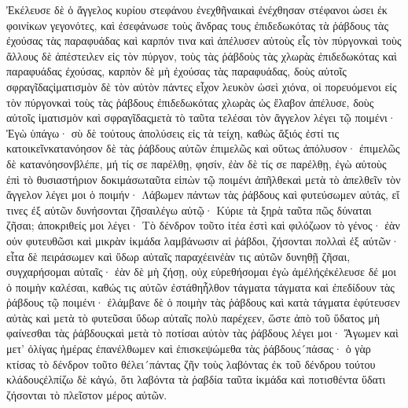 Ἐκέλευσε δὲ ὁ ἄγγελος κυρίου στεφάνου ἐνεχθῆναικαὶ ἐνέχθησαν στέφανοι ὡσει ἐκ φοινίκων γεγονότες, καὶ ἐσεφάνωσε τοὺς ἄνδρας τους ἐπιδεδωκότας τὰ ῥάβδους τὰς ἐχούσας τὰς παραφυάδας καὶ καρπόν τινα καὶ ἀπέλυσεν αὐτοὺς εἶς τὸν πύργονκαὶ τοὺς ἄλλους δὲ ἀπέστειλεν εἰς τὸν πύργον, τοὺς τὰς ῥάβδοὺς τὰς χλωρὰς ἐπιδεδωκότας καὶ παραφυάδας ἐχούσας, καρπὸν δὲ μὴ ἐχούσας τὰς παραφυάδας, δοὺς αὐτοῖς σφραγῖδαςἱματισμὸν δὲ τὸν αὐτὸν πάντες εἶχον λευκὸν ὡσεὶ χιόνα, οἱ πορευόμενοι εἰς τὸν πύργονκαὶ τοὺς τὰς ῥάβδους ἐπιδεδωκότας χλωρὰς ὡς ἔλαβον ἀπέλυσε, δοὺς αὐτοῖς ἱματισμὸν καὶ σφραγῖδαςμετὰ τὸ ταῦτα τελέσαι τὸν ἄγγελον λέγει τῷ ποιμένι· Ἐγὼ ὑπάγω· σὺ δὲ τούτους ἀπολύσεις εἰς τὰ τείχη, καθὼς ἄξιός ἐστί τις κατοικεῖνκατανόησον δὲ τὰς ῥάβδους αὐτῶν ἐπιμελῶς καὶ οὕτως ἀπόλυσον· ἐπιμελῶς δὲ κατανόησονβλέπε, μή τίς σε παρέλθῃ, φησίν, ἐὰν δὲ τίς σε παρέλθῃ, ἐγὼ αὐτοὺς ἐπὶ τὸ θυσιαστήριον δοκιμάσωταῦτα εἰπὼν τῷ ποιμένι ἀπῆλθεκαὶ μετὰ τὸ ἀπελθεῖν τὸν ἄγγελον λέγει μοι ὁ ποιμήν· Λάβωμεν πάντων τὰς ῥάβδους καὶ φυτεύσωμεν αὐτάς, εἴ τινες ἐξ αὐτῶν δυνήσονται ζῆσαιλέγω αὐτῷ· Κύριε τὰ ξηρὰ ταῦτα πῶς δύναται ζῆσαι; ἀποκριθείς μοι λέγει· Τὸ δένδρον τοῦτο ἰτέα ἐστὶ καὶ φιλόζωον τὸ γένος· ἐὰν οὐν φυτευθῶσι καὶ μικρὰν ἰκμάδα λαμβάνωσιν αἱ ῥάβδοι, ζήσονται πολλαὶ ἐξ αὐτῶν· εἶτα δὲ πειράσωμεν καὶ ὕδωρ αὐταῖς παραχέεινἐὰν τις αὐτῶν δυνηθῇ ζῆσαι, συγχαρήσομαι αὐταῖς· ἐὰν δὲ μὴ ζήσῃ, οὐχ εὑρεθήσομαι ἐγὼ ἀμέλήςἐκέλευσε δέ μοι ὁ ποιμὴν καλέσαι, καθώς τις αὐτῶν ἐστάθηἦλθον τάγματα τάγματα καὶ ἐπεδίδουν τὰς ῥάβδους τῷ ποιμένι· ἐλάμβανε δὲ ὁ ποιμὴν τὰς ῥάβδους καὶ κατὰ τάγματα ἐφύτευσεν αὐτὰς καὶ μετὰ τὸ φυτεῦσαι ὕδωρ αὐταῖς πολὺ παρέχεεν, ὥστε ἀπὸ τοῦ ὕδατος μὴ φαίνεσθαι τὰς ῥάβδουςκαὶ μετὰ τὸ ποτίσαι αὐτὸν τὰς ῥάβδους λέγει μοι· Ἄγωμεν καὶ μετ’ ὀλίγας ἡμέρας ἐπανέλθωμεν καὶ ἐπισκεψώμεθα τὰς ῥάβδους´πάσας· ὁ γὰρ κτίσας τὸ δένδρον τοῦτο θέλει´πάντας ζῆν τοὺς λαβόντας ἐκ τοῦ δένδρου τούτου κλάδουςἐλπίζω δὲ κἀγώ, ὅτι λαβόντα τὰ ῥαβδία ταῦτα ἰκμάδα καὶ ποτισθέντα ὕδατι ζήσονται τὸ πλεῖστον μέρος αὐτῶν.
